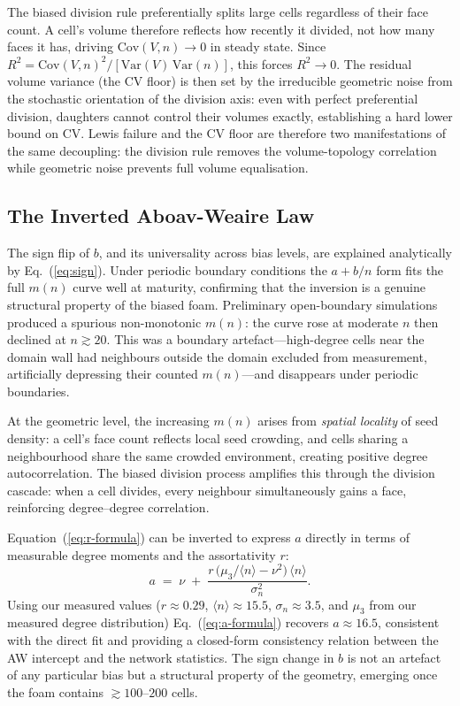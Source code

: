 \documentclass[aps,pre,reprint,amsmath,amssymb,floatfix]{revtex4-2}
\begin{document}
The biased division rule preferentially splits large cells regardless of their
face count.
A cell's volume therefore reflects how recently it divided, not how many faces
it has, driving $\mathrm{Cov}(V,n)\to0$ in steady state.
Since $R^2=\mathrm{Cov}(V,n)^2/[\mathrm{Var}(V)\,\mathrm{Var}(n)]$, this
forces $R^2\to0$.
The residual volume variance (the CV floor) is then set by the irreducible
geometric noise from the stochastic orientation of the division axis: even
with perfect preferential division, daughters cannot control their volumes
exactly, establishing a hard lower bound on CV.
Lewis failure and the CV floor are therefore two manifestations of the same
decoupling: the division rule removes the volume-topology correlation while
geometric noise prevents full volume equalisation.

\subsection{The Inverted Aboav-Weaire Law}
\label{subsec:inverted-aw}

The sign flip of $b$, and its universality across bias levels, are explained
analytically by Eq.~(\ref{eq:sign}).
Under periodic boundary conditions the $a+b/n$ form fits the full $m(n)$
curve well at maturity, confirming that the inversion is a genuine structural
property of the biased foam.
Preliminary open-boundary simulations produced a spurious non-monotonic
$m(n)$: the curve rose at moderate $n$ then declined at $n\gtrsim20$.
This was a boundary artefact---high-degree cells near the domain wall had
neighbours outside the domain excluded from measurement, artificially
depressing their counted $m(n)$---and disappears under periodic boundaries.

At the geometric level, the increasing $m(n)$ arises from \emph{spatial
locality} of seed density: a cell's face count reflects local seed crowding,
and cells sharing a neighbourhood share the same crowded environment,
creating positive degree autocorrelation.
The biased division process amplifies this through the division cascade: when
a cell divides, every neighbour simultaneously gains a face, reinforcing
degree--degree correlation.

Equation~(\ref{eq:r-formula}) can be inverted to express $a$ directly in
terms of measurable degree moments and the assortativity $r$:
\begin{equation}
  a \;=\; \nu \;+\;
  \frac{r\,\bigl(\mu_3/\langle n\rangle - \nu^2\bigr)\,\langle n\rangle}
       {\sigma_n^2}.
  \label{eq:a-formula}
\end{equation}
Using our measured values ($r\approx0.29$, $\langle n\rangle\approx15.5$,
$\sigma_n\approx3.5$, and $\mu_3$ from our measured degree distribution)
Eq.~(\ref{eq:a-formula}) recovers $a\approx16.5$, consistent with the
direct fit and providing a closed-form consistency relation between the
AW intercept and the network statistics.
The sign change in $b$ is not an artefact of any particular bias but a
structural property of the geometry, emerging once the foam contains
$\gtrsim100$--$200$ cells.
\end{document}
